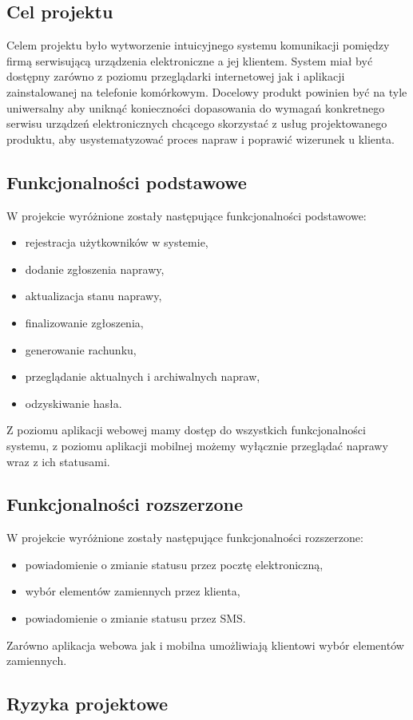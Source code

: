 \documentclass[a4paper,11pt]{article}
\begin{document}
\subsection{Cel projektu}
Celem projektu było wytworzenie intuicyjnego systemu komunikacji pomiędzy firmą serwisującą urządzenia elektroniczne a jej klientem. System miał być dostępny zarówno z poziomu przeglądarki internetowej jak i aplikacji zainstalowanej na telefonie komórkowym. Docelowy produkt powinien być na tyle uniwersalny aby uniknąć konieczności dopasowania do wymagań konkretnego serwisu urządzeń elektronicznych chcącego skorzystać z usług projektowanego produktu, aby usystematyzować proces napraw i poprawić wizerunek u klienta.
\subsection{Funkcjonalności podstawowe}
W projekcie wyróżnione zostały następujące funkcjonalności podstawowe:
\begin{itemize}
	\item rejestracja użytkowników w systemie,
	\item dodanie zgłoszenia naprawy,
	\item aktualizacja stanu naprawy,
	\item finalizowanie zgłoszenia,
	\item generowanie rachunku,
	\item przeglądanie aktualnych i archiwalnych napraw,
	\item odzyskiwanie hasła.
\end{itemize}
Z poziomu aplikacji webowej mamy dostęp do wszystkich funkcjonalności systemu, z poziomu aplikacji mobilnej możemy wyłącznie przeglądać naprawy wraz z ich statusami.
\subsection{Funkcjonalności rozszerzone}
W projekcie wyróżnione zostały następujące funkcjonalności rozszerzone:
\begin{itemize}
	\item powiadomienie o zmianie statusu przez pocztę elektroniczną,
	\item wybór elementów zamiennych przez klienta,
	\item powiadomienie o zmianie statusu przez SMS.
\end{itemize}
Zarówno aplikacja webowa jak i mobilna umożliwiają klientowi wybór elementów zamiennych.
\subsection{Ryzyka projektowe}
\end{document}
